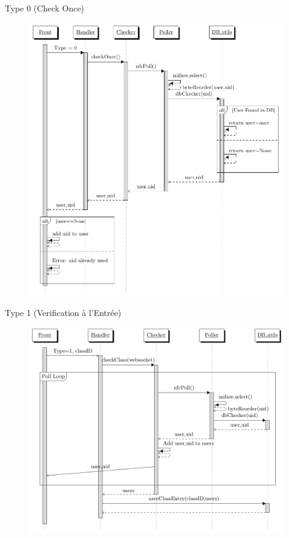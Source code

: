 \documentclass[aspectratio=169]{beamer}
\begin{document}
\begin{frame}{Type 0 (Check Once)}
  \begin{figure}[]
    \includegraphics[height=.9\textheight]{../assets/nfcSeqOnce.png}
  \end{figure}
\end{frame}

\begin{frame}{Type 1 (Verification à l'Entrée)}
  \begin{figure}[]
    \includegraphics[height=.9\textheight]{../assets/nfcSeqEntry.png}
  \end{figure}
\end{frame}
\end{document}
